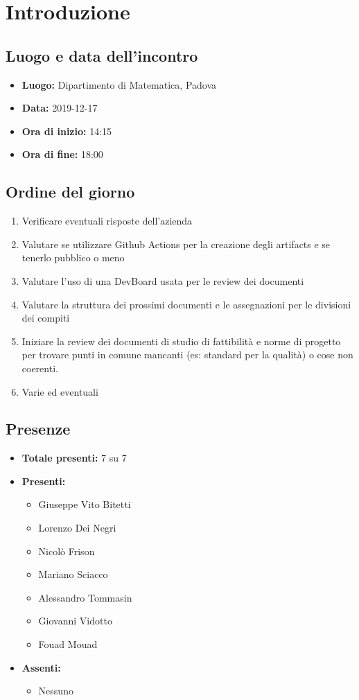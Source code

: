 \section*{Introduzione}

\subsection*{Luogo e data dell'incontro}
	\begin{itemize}
		\item \textbf{Luogo:} Dipartimento di Matematica, Padova
		\item \textbf{Data:} 2019-12-17
		\item \textbf{Ora di inizio:} 14:15
		\item \textbf{Ora di fine:} 18:00
	\end{itemize}

\subsection*{Ordine del giorno}
	\begin{enumerate}
		\item Verificare eventuali risposte dell'azienda
		\item Valutare se utilizzare Github Actions per la creazione degli artifacts e se tenerlo pubblico o meno
		\item Valutare l'uso di una DevBoard usata per le review dei documenti
		\item Valutare la struttura dei prossimi documenti e le assegnazioni per le divisioni dei compiti
		\item Iniziare la review dei documenti di studio di fattibilità e norme di progetto per trovare punti in comune mancanti (es: standard per la qualità) o cose non coerenti.
		\item Varie ed eventuali
	\end{enumerate}

\subsection*{Presenze}
	\begin{itemize}
		\item \textbf{Totale presenti:} 7 su 7
		\item \textbf{Presenti: }
			\begin{itemize}			
				\item Giuseppe Vito Bitetti
				\item Lorenzo Dei Negri
				\item Nicolò Frison
				\item Mariano Sciacco
				\item Alessandro Tommasin
				\item Giovanni Vidotto
				\item Fouad Mouad
			\end{itemize}
		\item \textbf{Assenti: } 
			\begin{itemize}	
				\item Nessuno
			\end{itemize}
	\end{itemize}


